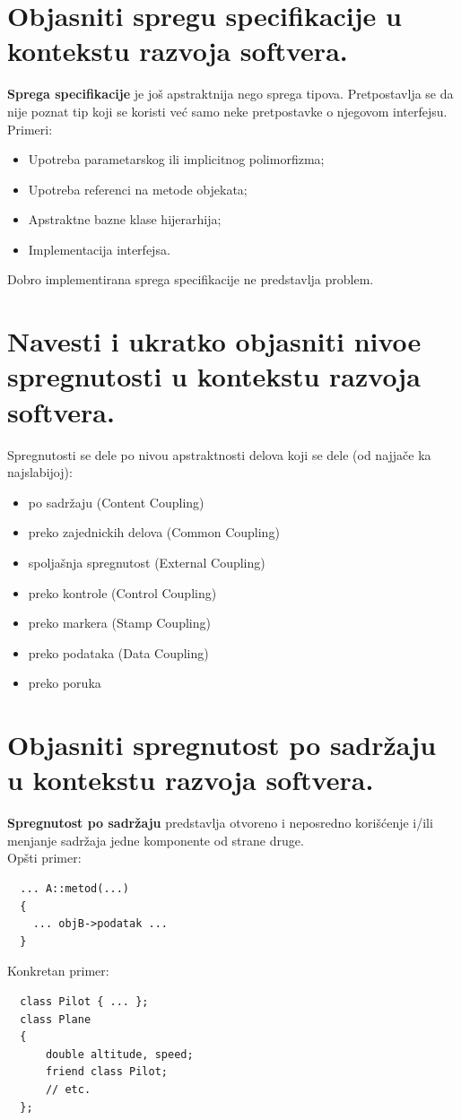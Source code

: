 \documentclass[a4paper]{article}
\begin{document}
\section{Objasniti spregu specifikacije u kontekstu razvoja softvera.}
  \textbf{Sprega specifikacije} je još apstraktnija nego sprega tipova. Pretpostavlja se 
  da nije poznat tip koji se koristi već samo neke pretpostavke o njegovom interfejsu. Primeri:
  \begin{itemize}
    \item Upotreba parametarskog ili implicitnog polimorfizma;
    \item Upotreba referenci na metode objekata;
    \item Apstraktne bazne klase hijerarhija;
    \item Implementacija interfejsa.
  \end{itemize}
  Dobro implementirana sprega specifikacije ne predstavlja problem.

\section{Navesti i ukratko objasniti nivoe spregnutosti u kontekstu razvoja softvera.}
  Spregnutosti se dele po nivou apstraktnosti delova koji se dele (od najjače ka najslabijoj):
  \cite{gfg_coupling_and_cohesion}
  \begin{itemize}
    \item po sadržaju (Content Coupling)
    \item preko zajednickih delova (Common Coupling)
    \item spoljašnja spregnutost (External Coupling)
    \item preko kontrole (Control Coupling)
    \item preko markera (Stamp Coupling)
    \item preko podataka (Data Coupling)
    \item preko poruka 
  \end{itemize}
  
\section{Objasniti spregnutost po sadržaju u kontekstu razvoja softvera.}
  \textbf{Spregnutost po sadržaju} predstavlja otvoreno i neposredno korišćenje
  i/ili menjanje sadržaja jedne komponente od strane druge. \\
  Opšti primer:
\begin{lstlisting}
  ... A::metod(...)
  {
    ... objB->podatak ...
  }\end{lstlisting}
Konkretan primer:
\begin{lstlisting}
  class Pilot { ... };
  class Plane
  {
      double altitude, speed;
      friend class Pilot;
      // etc.
  };\end{lstlisting}
\end{document}
